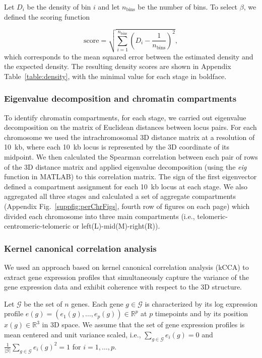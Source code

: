 Let $D_i$ be the density of bin $i$ and let $n_{\text{bins}}$ be the
number of bins. To select $\beta$, we defined the scoring function

\begin{equation}
\text{score} = \sqrt{\sum_{i = 1}^{n_\text{bins}} \left(D_i -
\frac{1}{n_\text{bins}}\right)^2},
\end{equation}
which corresponds to the mean squared error between the estimated density and
the expected density. The resulting density scores are shown in Appendix
Table~\ref{table:density}, with the minimal value for each stage in boldface.

\subsubsection{Eigenvalue decomposition and chromatin compartments}
\label{met:compartments}
To identify chromatin compartments, for each stage, we
carried out eigenvalue decomposition on the matrix of Euclidean
distances between locus pairs. For each chromosome we used the
intrachromosomal 3D distance matrix at a resolution of 10~kb, where
each 10~kb locus is represented by the 3D coordinate of its
midpoint. We then calculated the Spearman correlation between each
pair of rows of the 3D distance matrix and applied eigenvalue
decomposition (using the \emph{eig} function in MATLAB) to this
correlation matrix. The sign of the first eigenvector defined a
compartment assignment for each 10~kb locus at each stage. We also
aggregated all three stages and calculated a set of aggregate compartments
(Appendix Fig.~\ref{suppfig:perChrFigs}, fourth row of figures on each page)
which divided each chromosome into three main compartments (i.e.,
telomeric-centromeric-telomeric or left(L)-mid(M)-right(R)).

\subsubsection{Kernel canonical correlation analysis}
\label{met:kCCA}

We used an approach based on kernel canonical correlation analysis (kCCA)
\citep{bach:kernel,vert:graph,vert:extracting} to extract gene expression profiles that
simultaneously capture the variance of the gene expression data and exhibit
coherence with respect to the 3D structure.

Let $\mathcal{G}$ be the set of $n$ genes. Each gene $g\in\mathcal{G}$ is
characterized by its log expression profile $e(g) = \left( e_1(g), \ldots,
e_p(g)\right) \in \mathbb{R}^p$ at $p$ timepoints
and by its position $x(g) \in \mathbb{R}^3$
in 3D
space. We assume that the set of gene expression profiles is mean centered and
unit variance scaled, i.e., $\sum_{g\in\mathcal{G}}e_i(g) = 0$ and
$\frac{1}{|\mathcal{G}|}\sum_{g\in\mathcal{G}} e_i(g)^2 = 1$ for
$i=1,\ldots,p$.

